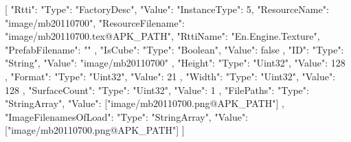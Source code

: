 [{
        "Rtti": {
            "Type": "FactoryDesc",
            "Value": {
                "InstanceType": 5,
                "ResourceName": "image/mb20110700",
                "ResourceFilename": "image/mb20110700.tex@APK_PATH",
                "RttiName": "En.Engine.Texture",
                "PrefabFilename": ""
            }
        },
        "IsCube": {
            "Type": "Boolean",
            "Value": false
        },
        "ID": {
            "Type": "String",
            "Value": "image/mb20110700"
        },
        "Height": {
            "Type": "Uint32",
            "Value": 128
        },
        "Format": {
            "Type": "Uint32",
            "Value": 21
        },
        "Width": {
            "Type": "Uint32",
            "Value": 128
        },
        "SurfaceCount": {
            "Type": "Uint32",
            "Value": 1
        },
        "FilePaths": {
            "Type": "StringArray",
            "Value": ["image/mb20110700.png@APK_PATH"]
        },
        "ImageFilenamesOfLoad": {
            "Type": "StringArray",
            "Value": ["image/mb20110700.png@APK_PATH"]
        }
    }]